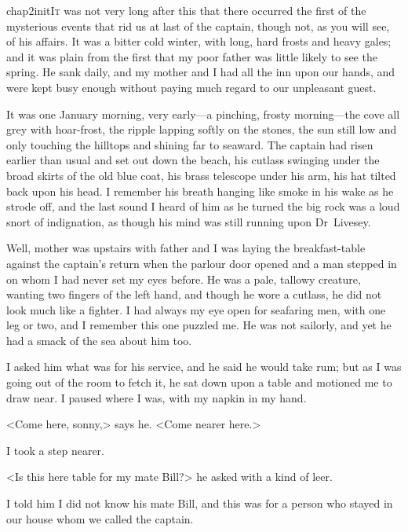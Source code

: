 

\lettrine{chap2initI}{t} was not very long after this that there occurred the first of the mysterious events that rid us at last of the captain, though not, as you will see, of his affairs. It was a bitter cold winter, with long, hard frosts and heavy gales; and it was plain from the first that my poor father was little likely to see the spring. He sank daily, and my mother and I had all the inn upon our hands, and were kept busy enough without paying much regard to our unpleasant guest.

It was one January morning, very early—a pinching, frosty morning—the cove all grey with hoar-frost, the ripple lapping softly on the stones, the sun still low and only touching the hilltops and shining far to seaward. The captain had risen earlier than usual and set out down the beach, his cutlass swinging under the broad skirts of the old blue coat, his brass telescope under his arm, his hat tilted back upon his head. I remember his breath hanging like smoke in his wake as he strode off, and the last sound I heard of him as he turned the big rock was a loud snort of indignation, as though his mind was still running upon Dr~Livesey.

Well, mother was upstairs with father and I was laying the breakfast-table against the captain's return when the parlour door opened and a man stepped in on whom I had never set my eyes before. He was a pale, tallowy creature, wanting two fingers of the left hand, and though he wore a cutlass, he did not look much like a fighter. I had always my eye open for seafaring men, with one leg or two, and I remember this one puzzled me. He was not sailorly, and yet he had a smack of the sea about him too.

I asked him what was for his service, and he said he would take rum; but as I was going out of the room to fetch it, he sat down upon a table and motioned me to draw near. I paused where I was, with my napkin in my hand.

<Come here, sonny,> says he. <Come nearer here.>

I took a step nearer.

<Is this here table for my mate Bill?> he asked with a kind of leer.

I told him I did not know his mate Bill, and this was for a person who stayed in our house whom we called the captain.

